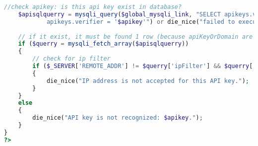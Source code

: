 \begin{lstlisting}[language=PHP,basicstyle=\tiny,caption=handle.php,label={lst:handle.php}]
	//check apikey: is this api key exist in database?	
	$apisqlquerry = mysqli_query($global_mysqli_link, "SELECT apikeys.verifier, apikeys.ipFilter FROM apikeys WHERE
			apikeys.verifier = '$apikey'") or die_nice("failed to execute query on Apikey check.");
		
	// if it exist, it must be found 1 row (because apiKeyOrDomain are unique)
	if ($querry = mysqli_fetch_array($apisqlquerry))
	{
		// check for ip filter	
		if ($_SERVER['REMOTE_ADDR'] != $querry['ipFilter'] && $querry['ipFilter'] != NULL)
		{
			die_nice("IP address is not accepted for this API key.");
		}
	} 
	else
	{
		die_nice("API key is not recognized: $apikey.");
	}
}
?>
\end{lstlisting}